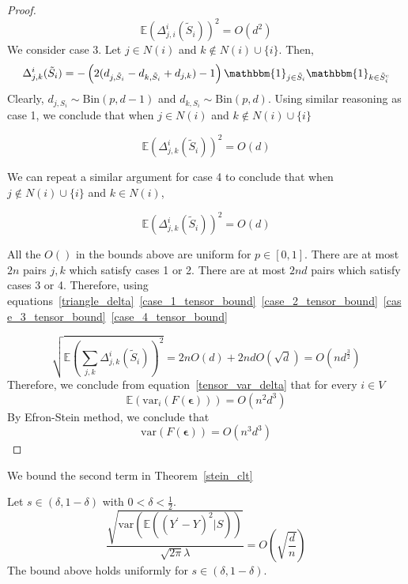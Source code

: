 \documentclass[final,12pt]{colt2018}
\begin{document}
\begin{proof}
\begin{equation}
\mathbb{E}\left(\Delta^{i}_{j,i}(\tilde{S}_i)\right)^2 = O(d^2) 
\label{case_2_tensor_bound}
\end{equation}
We consider case 3. Let $j\in N(i)$ and $k \not \in N(i)\cup\{i\}$. 
Then, $$\Delta_{j,k}^{i}(\tilde{S}_i) = - \left(2(d_{j,\tilde{S}_i} - d_{k,\tilde{S}_i} + d_{j,k}) -1\right)\mathbbm{1}_{j\in \tilde{S}_i}\mathbbm{1}_{k \in \tilde{S}_i^c}$$
Clearly, $d_{j,S_i} \sim \mathrm{Bin}(p,d-1)$ and $d_{k,S_i} \sim \mathrm{Bin}(p,d)$. Using similar reasoning as case 1, we conclude that when $j\in N(i)$ and $k \not \in N(i)\cup\{i\}$ 

\begin{equation}
\mathbb{E}\left(\Delta^{i}_{j,k}(\tilde{S}_i)\right)^2 = O(d) 
\label{case_3_tensor_bound}
\end{equation}


We can repeat a similar argument for case 4 to conclude that when
$j \not \in N(i)\cup\{i\}$ and $k \in N(i)$, 

\begin{equation}
\mathbb{E}\left(\Delta^{i}_{j,k}(\tilde{S}_i)\right)^2 = O(d) 
\label{case_4_tensor_bound}
\end{equation}


All the $O()$ in the bounds above are uniform for $p\in [0,1]$.
There are at most $2n$ pairs ${j,k}$ which satisfy cases 1 or 2. There are at most $2nd$ pairs which satisfy cases 3 or 4.
Therefore, using equations~\eqref{triangle_delta}~\eqref{case_1_tensor_bound}~\eqref{case_2_tensor_bound}~\eqref{case_3_tensor_bound}~\eqref{case_4_tensor_bound} 

$$\sqrt{\mathbb{E}\left(\sum_{j,k}\Delta^{i}_{j,k}(\tilde{S}_i)\right)^2}
 = 2nO(d) + 2ndO(\sqrt{d}) = O(nd^{\frac{3}{2}})$$
Therefore, we conclude from equation~\eqref{tensor_var_delta} that for every $i \in V$
$$\mathbb{E}(\mathrm{var}_i(F(\bm{\epsilon}))) = O(n^2d^3)$$
By Efron-Stein method, we conclude that
$$\mathrm{var}(F(\bm{\epsilon})) = O(n^3d^3)$$
\end{proof}



We bound the second term in Theorem~\ref{stein_clt}
\begin{lemma}
Let $s\in (\delta,1-\delta)$ with $0<\delta<\frac{1}{2}$.
\begin{equation}
 \frac{\sqrt{\mathrm{var}(\mathbb{E}((Y^{\prime}-Y)^2|S))}}{\sqrt{2\pi}\lambda} = O\left(\sqrt{\frac{d}{n}}\right)
\end{equation}
The bound above holds uniformly for $s\in (\delta,1-\delta)$.
\label{lem:second_term_clt}
\end{lemma}
\end{document}
